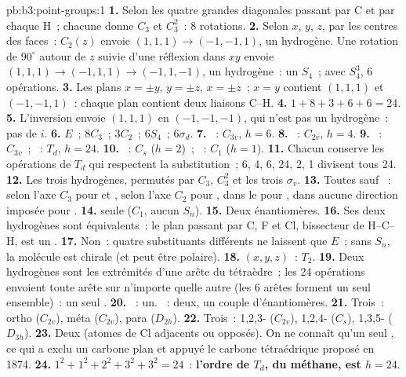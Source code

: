 \begin{solution}{pb:b3:point-groups:1}
\textbf{1.} Selon les quatre grandes diagonales passant par C et par
chaque H~; chacune donne
$C_3$ et $C_3^2$~: 8 rotations.
\textbf{2.} Selon $x$, $y$, $z$, par les centres des faces~: $C_2(z)$ envoie $(1,1,1)
\to (-1,-1,1)$, un hydrogène. Une rotation de $90^\circ$ autour de $z$
suivie d'une réflexion dans $xy$ envoie $(1,1,1) \to (-1,1,1) \to (-1,1,-1)$,
un hydrogène~: un
$S_4$~; avec $S_4^3$, 6 opérations.
\textbf{3.} Les plans $x = \pm y$, $y = \pm z$, $x = \pm z$~; $x = y$ contient
$(1,1,1)$ et $(-1,-1,1)$~: chaque plan contient deux liaisons C--H.
\textbf{4.} $1 + 8 + 3 + 6 + 6 = 24$.
\textbf{5.} L'inversion envoie $(1,1,1)$ en $(-1,-1,-1)$, qui n'est pas un
hydrogène~: pas de $i$.
\textbf{6.} $E$~; $8C_3$~; $3C_2$~; $6S_4$~; $6\sigma_d$.
\textbf{7.} ~: $C_{3v}$, $h = 6$.
\textbf{8.} ~: $C_{2v}$, $h = 4$.
\textbf{9.} ~: $C_{3v}$~; ~: $T_d$, $h = 24$.
\textbf{10.} ~: $C_s$ ($h = 2$)~; ~: $C_1$ ($h = 1$).
\textbf{11.} Chacun conserve les opérations de $T_d$ qui respectent la
substitution~; 6, 4, 6, 24, 2, 1 divisent tous 24.
\textbf{12.} Les trois hydrogènes, permutés par $C_3$, $C_3^2$ et les
trois
$\sigma_v$.
\textbf{13.} Toutes sauf ~: selon l'axe $C_3$ pour  et
, selon l'axe $C_2$ pour , dans le 
pour , dans aucune direction imposée pour .
\textbf{14.}  seule ($C_1$, aucun $S_n$).
\textbf{15.} Deux énantiomères.
\textbf{16.} Ses deux hydrogènes sont équivalents~: le plan passant par
C, F et Cl, bissecteur de H--C--H, est un .
\textbf{17.} Non~: quatre substituants différents ne laissent que $E$~;
sans $S_n$, la molécule est chirale (et peut être polaire).
\textbf{18.} $(x, y, z)$~: $T_2$.
\textbf{19.} Deux hydrogènes sont les extrémités d'une arête du
tétraèdre~; les 24 opérations envoient toute arête sur n'importe quelle
autre (les 6 arêtes forment un seul ensemble)~: un seul
.
\textbf{20.} ~: un. ~: deux, un couple
d'énantiomères.
\textbf{21.} Trois~: ortho ($C_{2v}$), méta ($C_{2v}$), para ($D_{2h}$).
\textbf{22.} Trois~: 1,2,3- ($C_{2v}$), 1,2,4- ($C_s$), 1,3,5- ($D_{3h}$).
\textbf{23.} Deux (atomes de Cl adjacents ou opposés). On ne connaît
qu'un seul , ce qui a exclu un carbone plan et appuyé le
carbone tétraédrique proposé en 1874.
\textbf{24.} $1^2 + 1^2 + 2^2 + 3^2 + 3^2 = 24$~: \textbf{l'ordre de $T_d$,
 du méthane, est $h = 24$}.
\end{solution}
